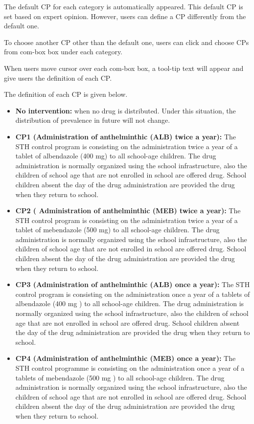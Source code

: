 \documentclass[12pt,oneside]{memoir}
\begin{document}
The default CP for each category is automatically appeared. This default CP is set based on expert opinion. However, users can define a CP differently from the default one. 

To choose another CP other than the default one, users can click and choose CPs from com-box box under each category.

When users move cursor over each com-box box, a tool-tip text will appear and give users the definition of each CP. 

The definition of each CP is given below.

\begin{itemize}
 \item \textbf{No intervention:} when no drug is distributed. Under this situation, the distribution of prevalence in future will not change. 
 \item \textbf{CP1 (Administration of anthelminthic (ALB)  twice a year):} The STH control program is consisting on the administration twice a year of a tablet of albendazole (400 mg) to all school-age children. The drug administration is normally organized using the school infrastructure, also the children of school age that are not enrolled in school are offered drug. School children absent the day of the drug administration are provided the drug when they return to school.
 \item \textbf{CP2 ( Administration of anthelminthic (MEB)  twice a year):} The STH control program is consisting on the administration twice a year of a tablet  of mebendazole (500 mg) to all school-age children. The drug administration is normally organized using the school infrastructure, also the children of school age that are not enrolled in school are offered drug. School children absent the day of the drug administration are provided the drug when they return to school.
 \item \textbf{CP3 (Administration of anthelminthic (ALB) once a year):} The STH control program is consisting on the administration once a year of a tablets of albendazole (400 mg ) to all school-age children. The drug administration is normally organized using the school infrastructure, also the children of school age that are not enrolled in school are offered drug. School children absent the day of the drug administration are provided the drug when they return to school. 
 \item \textbf{CP4 (Administration of anthelminthic (MEB) once a year):} The STH control programme is consisting on the administration once a year of a tablets of mebendazole (500 mg ) to all school-age children. The drug administration is normally organized using the school infrastructure, also the children of school age that are not enrolled in school are offered drug. School children absent the day of the drug administration are provided the drug when they return to school.

\end{itemize}
\end{document}
